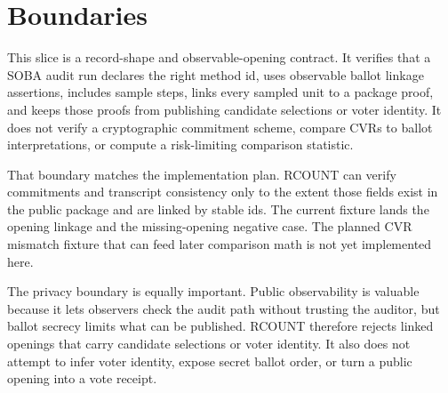 \section{Boundaries}

This slice is a record-shape and observable-opening contract. It verifies that
a SOBA audit run declares the right method id, uses observable ballot linkage
assertions, includes sample steps, links every sampled unit to a package proof,
and keeps those proofs from publishing candidate selections or voter identity.
It does not verify a cryptographic commitment scheme, compare CVRs to ballot
interpretations, or compute a risk-limiting comparison statistic.

That boundary matches the implementation plan. RCOUNT can verify commitments
and transcript consistency only to the extent those fields exist in the public
package and are linked by stable ids. The current fixture lands the opening
linkage and the missing-opening negative case. The planned CVR mismatch fixture
that can feed later comparison math is not yet implemented here.

The privacy boundary is equally important. Public observability is valuable
because it lets observers check the audit path without trusting the auditor,
but ballot secrecy limits what can be published. RCOUNT therefore rejects
linked openings that carry candidate selections or voter identity. It also does
not attempt to infer voter identity, expose secret ballot order, or turn a
public opening into a vote receipt.
